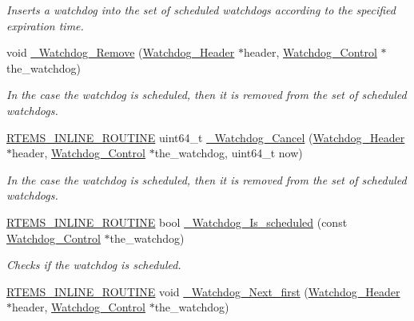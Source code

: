 \begin{DoxyCompactItemize}
\begin{DoxyCompactList}\small\item\em Inserts a watchdog into the set of scheduled watchdogs according to the specified expiration time. \end{DoxyCompactList}\item 
void \mbox{\hyperlink{group__RTEMSScoreWatchdog_ga4c6dafd66518b5af7edb7c0d67572065}{\+\_\+\+Watchdog\+\_\+\+Remove}} (\mbox{\hyperlink{structWatchdog__Header}{Watchdog\+\_\+\+Header}} $\ast$header, \mbox{\hyperlink{structWatchdog__Control}{Watchdog\+\_\+\+Control}} $\ast$the\+\_\+watchdog)
\begin{DoxyCompactList}\small\item\em In the case the watchdog is scheduled, then it is removed from the set of scheduled watchdogs. \end{DoxyCompactList}\item 
\mbox{\hyperlink{group__RTEMSScoreBaseDefs_gac216239df231d5dbd15e3520b0b9313f}{R\+T\+E\+M\+S\+\_\+\+I\+N\+L\+I\+N\+E\+\_\+\+R\+O\+U\+T\+I\+NE}} uint64\+\_\+t \mbox{\hyperlink{group__RTEMSScoreWatchdog_gac3404e106d8637114b5205d4eba1f7c6}{\+\_\+\+Watchdog\+\_\+\+Cancel}} (\mbox{\hyperlink{structWatchdog__Header}{Watchdog\+\_\+\+Header}} $\ast$header, \mbox{\hyperlink{structWatchdog__Control}{Watchdog\+\_\+\+Control}} $\ast$the\+\_\+watchdog, uint64\+\_\+t now)
\begin{DoxyCompactList}\small\item\em In the case the watchdog is scheduled, then it is removed from the set of scheduled watchdogs. \end{DoxyCompactList}\item 
\mbox{\hyperlink{group__RTEMSScoreBaseDefs_gac216239df231d5dbd15e3520b0b9313f}{R\+T\+E\+M\+S\+\_\+\+I\+N\+L\+I\+N\+E\+\_\+\+R\+O\+U\+T\+I\+NE}} bool \mbox{\hyperlink{group__RTEMSScoreWatchdog_gaa77ec8a34fd2830fab0a5bb639c4ab06}{\+\_\+\+Watchdog\+\_\+\+Is\+\_\+scheduled}} (const \mbox{\hyperlink{structWatchdog__Control}{Watchdog\+\_\+\+Control}} $\ast$the\+\_\+watchdog)
\begin{DoxyCompactList}\small\item\em Checks if the watchdog is scheduled. \end{DoxyCompactList}\item 
\mbox{\hyperlink{group__RTEMSScoreBaseDefs_gac216239df231d5dbd15e3520b0b9313f}{R\+T\+E\+M\+S\+\_\+\+I\+N\+L\+I\+N\+E\+\_\+\+R\+O\+U\+T\+I\+NE}} void \mbox{\hyperlink{group__RTEMSScoreWatchdog_gaa3f2959cd64e5f27cf67d1b89c45303a}{\+\_\+\+Watchdog\+\_\+\+Next\+\_\+first}} (\mbox{\hyperlink{structWatchdog__Header}{Watchdog\+\_\+\+Header}} $\ast$header, \mbox{\hyperlink{structWatchdog__Control}{Watchdog\+\_\+\+Control}} $\ast$the\+\_\+watchdog)

\end{DoxyCompactItemize}
